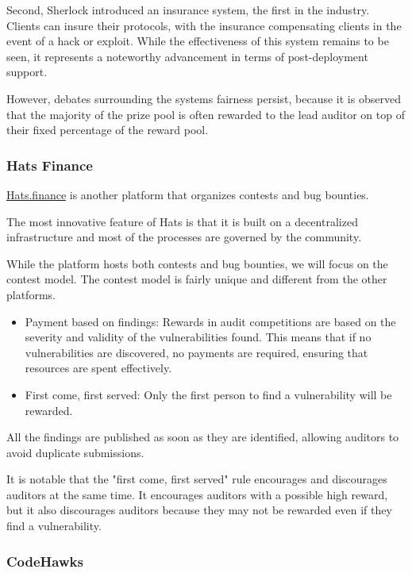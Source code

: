 \documentclass[10pt]{extarticle}
\def\tightlist{}
\begin{document}
Second, Sherlock introduced an insurance system, the first in the
industry. Clients can insure their protocols, with the insurance
compensating clients in the event of a hack or exploit. While the
effectiveness of this system remains to be seen, it represents a
noteworthy advancement in terms of post-deployment support.

However, debates surrounding the system\textquotesingle s fairness
persist, because it is observed that the majority of the prize pool is
often rewarded to the lead auditor on top of their fixed percentage of
the reward pool.

\subsubsection{ Hats Finance}\label{333-hats-finance}

\href{https://app.hats.finance/}{Hats.finance} is another platform that
organizes contests and bug bounties.

The most innovative feature of Hats is that it is built on a
decentralized infrastructure and most of the processes are governed by
the community.

While the platform hosts both contests and bug bounties, we will focus
on the contest model. The contest model is fairly unique and different
from the other platforms.

\begin{itemize}
\tightlist
\item
  Payment based on findings: Rewards in audit competitions are based on
  the severity and validity of the vulnerabilities found. This means
  that if no vulnerabilities are discovered, no payments are required,
  ensuring that resources are spent effectively.
\item
  First come, first served: Only the first person to find a
  vulnerability will be rewarded.
\end{itemize}

All the findings are published as soon as they are identified, allowing
auditors to avoid duplicate submissions.

It is notable that the "first come, first served" rule encourages and
discourages auditors at the same time. It encourages auditors with a
possible high reward, but it also discourages auditors because they may
not be rewarded even if they find a vulnerability.

\subsubsection{ CodeHawks}\label{334-codehawks}
\end{document}
